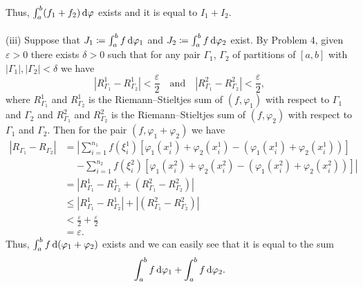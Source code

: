 \begin{solution}
\begin{align*}
  \end{align*}
  Thus, $\int_a^b (f_1+f_2)\mathop{}\!\mathrm{d}\varphi$ exists and it is equal to
  $I_1+I_2$.
  \\\\
  (iii) Suppose that $J_1\coloneq\int_a^bf\mathop{}\!\mathrm{d}\varphi_1$ and
  $J_2\coloneq\int_a^bf\mathop{}\!\mathrm{d}\varphi_2$ exist. By Problem 4, given
  $\varepsilon>0$ there exists $\delta>0$ such that for any pair $\Gamma_1$,
  $\Gamma_2$ of partitions of $[a,b]$ with $|\Gamma_1|,|\Gamma_2|<\delta$
  we have
  \[
    |R_{\Gamma_1}^1-R_{\Gamma_2}^1|<\frac{\varepsilon}{2}\quad\text{and}\quad
    |R_{\Gamma_1}^2-R_{\Gamma_2}^2|<\frac{\varepsilon}{2},
  \]
  where $R_{\Gamma_1}^1$ and $R_{\Gamma_2}^1$ is the Riemann--Stieltjes sum
  of $(f,\varphi_1)$ with respect to $\Gamma_1$ and $\Gamma_2$ and
  $R_{\Gamma_1}^2$ and $R_{\Gamma_2}^2$ is the Riemann--Stieltjes sum of
  $(f,\varphi_2)$ with respect to $\Gamma_1$ and $\Gamma_2$. Then for the
  pair $(f,\varphi_1+\varphi_2)$ we have
  \begin{align*}
    |R_{\Gamma_1}-R_{\Gamma_2}|
    &=%
      \left|%
      \sum_{i=1}^{n_1}f(\xi_i^1)\left[\varphi_1(x_i^1)+\varphi_2(x_i^1)
      -(\varphi_1(x_i^1)+\varphi_2(x_i^1))\right]\right.\\
    &\phantom{{}={}}%
      \left.%
      -\sum_{i=1}^{n_2}f(\xi_i^2)\left[\varphi_1(x_i^2)+\varphi_2(x_i^2)
      -(\varphi_1(x_i^2)+\varphi_2(x_i^2))\right]
      \right|\\
    &=\left|%
      R_{\Gamma_1}^1-R_{\Gamma_2}^1+(R_{\Gamma_1}^2-R_{\Gamma_2}^2)
      \right|\\
    &\leq|%
      R_{\Gamma_1}^1-R_{\Gamma_2}^1
      |+
      |%
      (R_{\Gamma_1}^2-R_{\Gamma_2}^2)
      |\\
    &<\frac{\varepsilon}{2}+\frac{\varepsilon}{2}\\
    &=\varepsilon.
  \end{align*}
  Thus, $\int_a^bf\mathop{}\!\mathrm{d}(\varphi_1+\varphi_2)$ exists and we can easily see
  that it is equal to the sum
  \[
    \int_a^bf\mathop{}\!\mathrm{d}\varphi_1
    +\int_a^bf\mathop{}\!\mathrm{d}\varphi_2.
  \]
\end{solution}

